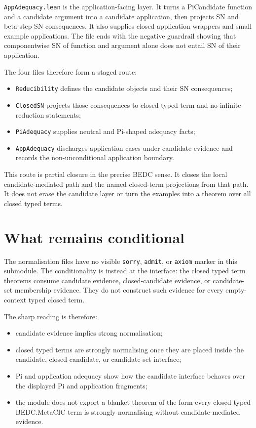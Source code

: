 \texttt{AppAdequacy.lean} is the application-facing layer. It turns a
PiCandidate function and a candidate argument into a candidate application, then
projects SN and beta-step SN consequences. It also supplies closed application
wrappers and small example applications. The file ends with the negative
guardrail showing that componentwise SN of function and argument alone does not
entail SN of their application.

The four files therefore form a staged route:
\begin{itemize}
\item \texttt{Reducibility} defines the candidate objects and their SN
  consequences;
\item \texttt{ClosedSN} projects those consequences to closed typed term and
  no-infinite-reduction statements;
\item \texttt{PiAdequacy} supplies neutral and Pi-shaped adequacy facts;
\item \texttt{AppAdequacy} discharges application cases under candidate evidence
  and records the non-unconditional application boundary.
\end{itemize}

This route is partial closure in the precise BEDC sense. It closes the local
candidate-mediated path and the named closed-term projections from that path. It
does not erase the candidate layer or turn the examples into a theorem over all
closed typed terms.

\section{What remains conditional}
\label{sec:metacic-normalization-audit-map-conditional}

The normalisation files have no visible \texttt{sorry}, \texttt{admit}, or
\texttt{axiom} marker in this submodule. The conditionality is instead at the
interface: the closed typed term theorems consume candidate evidence,
closed-candidate evidence, or candidate-set membership evidence. They do not
construct such evidence for every empty-context typed closed term.

The sharp reading is therefore:
\begin{itemize}
\item candidate evidence implies strong normalisation;
\item closed typed terms are strongly normalising once they are placed inside the
  candidate, closed-candidate, or candidate-set interface;
\item Pi and application adequacy show how the candidate interface behaves over
  the displayed Pi and application fragments;
\item the module does not export a blanket theorem of the form every closed typed
  BEDC.MetaCIC term is strongly normalising without candidate-mediated evidence.
\end{itemize}

